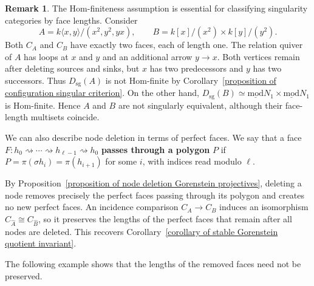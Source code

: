 \documentclass[11pt]{article}
\newcommand{\smod}{\operatorname{\underline{mod}}}
\theoremstyle{definition}
\newtheorem{remark}[theorem]{Remark}
\begin{document}
		\begin{remark}\label{remark of face lengths without Hom finiteness}
			The Hom-finiteness assumption is essential for classifying singularity categories by face lengths. Consider
			\[
				A=k\langle x,y\rangle/(x^2,y^2,yx),
				\qquad
				B=k[x]/(x^2)\times k[y]/(y^2).
			\]
			Both $C_A$ and $C_B$ have exactly two faces, each of length one. The relation quiver of $A$ has loops at $x$ and $y$ and an additional arrow $y\to x$.
			Both vertices remain after deleting sources and sinks, but $x$ has two predecessors and $y$ has two successors. Thus $D_{\mathrm{sg}}(A)$ is not Hom-finite by Corollary~\ref{proposition of configuration singular criterion}. On the other hand, $D_{\mathrm{sg}}(B)\simeq\smod N_1\times\smod N_1$ is Hom-finite.
			Hence $A$ and $B$ are not singularly equivalent, although their face-length multisets coincide.
		\end{remark}

		We can also describe node deletion in terms of perfect faces. We say that a face $F:h_0\rightsquigarrow\cdots\rightsquigarrow h_{\ell-1} \rightsquigarrow h_0$ \textbf{passes through a polygon} $P$ if $P=\pi(\sigma h_i)=\pi(h_{i+1})$ for some $i$, with indices read modulo $\ell$. 

		By Proposition~\ref{proposition of node deletion Gorenstein projectives}, deleting a node removes precisely the perfect faces passing through its polygon and creates no new perfect faces.
		An incidence comparison $C_A\to C_B$ induces an isomorphism $C_{\widehat A}\cong C_{\widehat B}$, so it preserves the lengths of the perfect faces that remain after all nodes are deleted. This recovers Corollary~\ref{corollary of stable Gorenstein quotient invariant}.

		The following example shows that the lengths of the removed faces need not be preserved.
\end{document}
